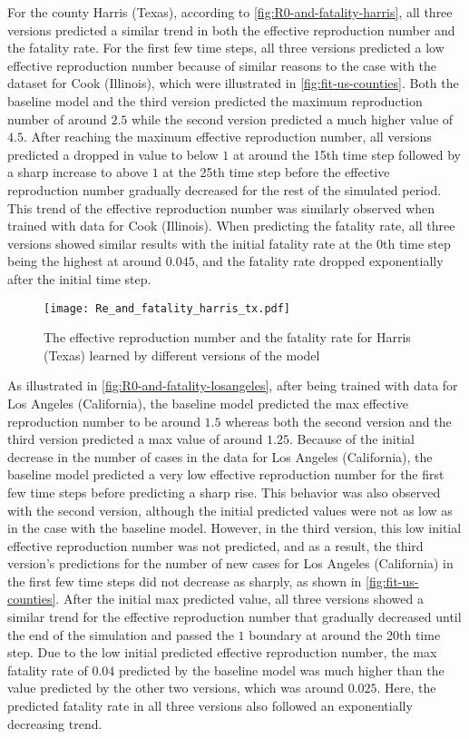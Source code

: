 For the county Harris (Texas), according to \autoref{fig:R0-and-fatality-harris}, all three versions predicted a similar trend in both the effective reproduction number and the fatality rate.
For the first few time steps, all three versions predicted a low effective reproduction number because of similar reasons to the case with the dataset for Cook (Illinois), which were illustrated in \autoref{fig:fit-us-counties}.
Both the baseline model and the third version predicted the maximum reproduction number of around $2.5$ while the second version predicted a much higher value of $4.5$.
After reaching the maximum effective reproduction number, all versions predicted a dropped in value to below $1$ at around the 15th time step followed by a sharp increase to above $1$ at the 25th time step before the effective reproduction number gradually decreased for the rest of the simulated period.
This trend of the effective reproduction number was similarly observed when trained with data for Cook (Illinois).
When predicting the fatality rate, all three versions showed similar results with the initial fatality rate at the 0th time step being the highest at around $0.045$, and the fatality rate dropped exponentially after the initial time step.

\begin{figure}[!htb]
    \centering
    \texttt{[image: Re\_and\_fatality\_harris\_tx.pdf]}
    \caption{The effective reproduction number and the fatality rate for Harris (Texas) learned by different versions of the model}
    \label{fig:R0-and-fatality-harris}
\end{figure}

As illustrated in \autoref{fig:R0-and-fatality-losangeles}, after being trained with data for Los Angeles (California), the baseline model predicted the max effective reproduction number to be around $1.5$ whereas both the second version and the third version predicted a max value of around $1.25$.
Because of the initial decrease in the number of cases in the data for Los Angeles (California), the baseline model predicted a very low effective reproduction number for the first few time steps before predicting a sharp rise.
This behavior was also observed with the second version, although the initial predicted values were not as low as in the case with the baseline model.
However, in the third version, this low initial effective reproduction number was not predicted, and as a result, the third version's predictions for the number of new cases for Los Angeles (California) in the first few time steps did not decrease as sharply, as shown in \autoref{fig:fit-us-counties}.
After the initial max predicted value, all three versions showed a similar trend for the effective reproduction number that gradually decreased until the end of the simulation and passed the $1$ boundary at around the 20th time step.
Due to the low initial predicted effective reproduction number, the max fatality rate of $0.04$ predicted by the baseline model was much higher than the value predicted by the other two versions, which was around $0.025$.
Here, the predicted fatality rate in all three versions also followed an exponentially decreasing trend.

